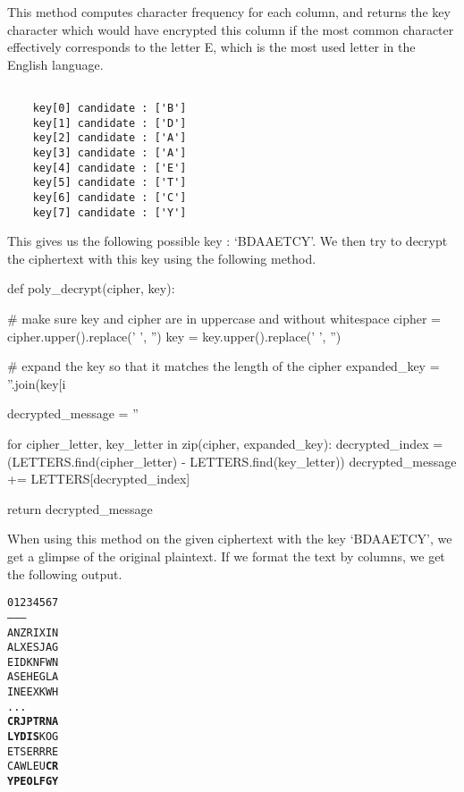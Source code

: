 \documentclass{article}
\begin{document}
This method computes character frequency for each column, and returns the key character which would have encrypted this column if the most common character effectively corresponds to the letter E, which is the most used letter in the English language.

\begin{verbatim}

    key[0] candidate : ['B']
    key[1] candidate : ['D']
    key[2] candidate : ['A']
    key[3] candidate : ['A']
    key[4] candidate : ['E']
    key[5] candidate : ['T']
    key[6] candidate : ['C']
    key[7] candidate : ['Y']

\end{verbatim}

This gives us the following possible key : `BDAAETCY'. We then try to decrypt the ciphertext with this key using the following method.

\bigskip
\begin{python}
def poly_decrypt(cipher, key):

    # make sure key and cipher are in uppercase and without whitespace
    cipher = cipher.upper().replace(' ', '')
    key = key.upper().replace(' ', '')

    # expand the key so that it matches the length of the cipher
    expanded_key = ''.join(key[i %

    decrypted_message = ''

    for cipher_letter, key_letter in zip(cipher, expanded_key):
        decrypted_index = (LETTERS.find(cipher_letter) - LETTERS.find(key_letter)) %
        decrypted_message += LETTERS[decrypted_index]

    return decrypted_message
\end{python}
\bigskip

When using this method on the given ciphertext with the key `BDAAETCY', we get a glimpse of the original plaintext. If we format the text by columns, we get the following output.


\begin{alltt}
    \begin{center}
        01234567
        --------
        ANZRIXIN
        ALXESJAG
        EIDKNFWN
        ASEHEGLA
        INEEXKWH
        ...
        \textbf{CRJPTRNA}
        \textbf{LYDIS}KOG
        ETSERRRE
        CAWLEU\textbf{CR}
        \textbf{YPEOLFGY}
    \end{center}
\end{alltt}
\end{document}

